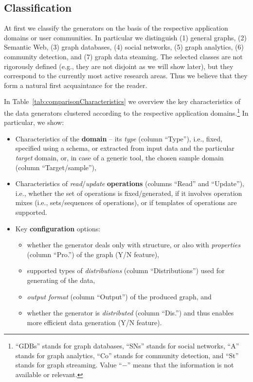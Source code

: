 %

\subsection{Classification}

At first we classify the generators on the basis of the respective application domains or user communities. In particular we distinguish (1) general graphs, (2) Semantic Web, (3) graph databases, (4) social networks, (5) graph analytics, (6) community detection, and (7) graph data steaming. The selected classes are not rigorously defined (e.g., they are not disjoint as we will show later), but they correspond to the currently most active research areas. Thus we believe that they form a natural first acquaintance for the reader.

In Table~\ref{tab:comparisonCharacteristics}   we overview the key characteristics of the data generators clustered according to the respective application domains.\footnote{``GDBs'' stands for graph databases, ``SNs'' stands for social networks, ``A'' stands for graph analytics, ``Co'' stands for community detection, and ``St'' stands for graph streaming. Value ``$-$'' means that the information is not available or relevant.} In particular, we show:

\begin{itemize}
\item Characteristics of the \textbf{domain} -- its \textit{type} (column ``Type''), i.e.,  fixed, specified using a schema, or extracted from input data and the particular \textit{target} domain, or, in case of a generic tool, the chosen sample domain (column ``Target/sample''),
\item Characteristics of \textit{read}/\textit{update} \textbf{operations} (columns ``Read'' and ``Update''), i.e., whether the set of operations is fixed/generated, if it involves operation mixes (i.e., sets/sequences of operations), or if templates of operations are supported.
\item Key \textbf{configuration} options:
  \begin{itemize}
    \item whether the generator deals only with structure, or also with \emph{properties} (column ``Pro.'') of the graph (Y/N feature),
    \item supported types of \emph{distributions} (column ``Distributions'') used for generating of the data,
    \item \textit{output format} (column ``Output'') of the produced graph, and
    \item  whether the generator is \textit{distributed} (column ``Dis.'') and thus enables more efficient data generation (Y/N feature).
  \end{itemize}
\end{itemize}


